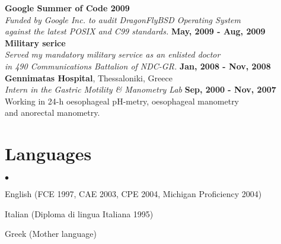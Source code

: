 \documentclass[margin,line]{res}
\newenvironment{list2}{
  \begin{list}{$\bullet$}{%
      \setlength{\itemsep}{0in}
      \setlength{\parsep}{0in} \setlength{\parskip}{0in}
      \setlength{\topsep}{0in} \setlength{\partopsep}{0in}
      \setlength{\leftmargin}{0.2in}}}{\end{list}}
\begin{document}
\begin{resume}
{\bf Google Summer of Code 2009}\\
{\em Funded by Google Inc. to audit DragonFlyBSD Operating System\\ against the latest POSIX and C99 standards.}
\hfill {\bf May, 2009 - Aug, 2009}\\

{\bf Military serice}\\
{\em Served my mandatory military service as an enlisted doctor\\in 490 Communications Battalion of NDC-GR.}
\hfill {\bf Jan, 2008 - Nov, 2008}\\

{\bf Gennimatas Hospital}, Thessaloniki, Greece\\
{\em Intern in the Gastric Motility \& Manometry Lab} \hfill {\bf Sep, 2000 - Nov, 2007}\\
Working in 24-h oesophageal pH-metry, oesophageal manometry\\
and anorectal manometry.

\section{\sc Languages}
\begin{list2}
\item English (FCE 1997, CAE 2003, CPE 2004, Michigan Proficiency 2004)
\item Italian (Diploma di lingua Italiana 1995)
\item Greek (Mother language)
\end{list2}


\end{resume}
\end{document}
